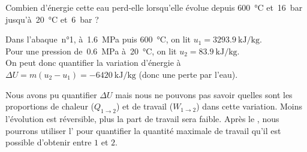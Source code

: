 			\begin{anexample}
			Combien d’énergie cette eau perd-elle lorsqu’elle évolue depuis \SI{600}{\degreeCelsius} et~\SI{16}{\bar} jusqu’à~\SI{20}{\degreeCelsius} et~\SI{6}{\bar} ?
			
				\begin{answer}Dans l’abaque~n°1, à~\SI{1,6}{\mega\pascal} puis \SI{600}{\degreeCelsius}, on lit $u_1 = \SI{3293,9}{\kilo\joule\per\kilogram}$.\\
				Pour une pression de~\SI{0,6}{\mega\pascal} à~\SI{20}{\degreeCelsius}, on lit $u_2 = \SI{83,9}{\kilo\joule\per\kilogram}$.\\
				On peut donc quantifier la variation d’énergie à $\Delta U = m (u_2 - u_1) = \SI{-6420}{\kilo\joule\per\kilogram}$ (donc une perte par l’eau).
			
				\begin{remark}Nous avons pu quantifier $\Delta U$ mais nous ne pouvons pas savoir quelles sont les proportions de chaleur ($Q_{1 \to 2}$) et de travail ($W_{1 \to 2}$) dans cette variation. Moins l’évolution est réversible, plus la part de travail sera faible. Après le \courshuit, nous pourrons utiliser l’ pour quantifier la quantité maximale de travail qu’il est possible d’obtenir entre $1$ et $2$.\end{remark}\end{answer}
			\end{anexample}
	
